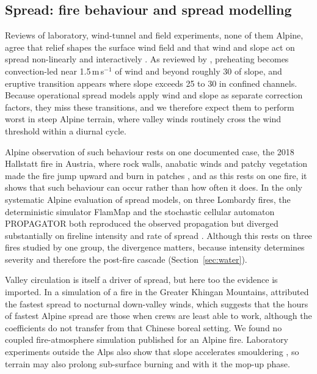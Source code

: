 \documentclass[11pt,a4paper]{article}
\begin{document}
\subsection{Spread: fire behaviour and spread modelling}

Reviews of laboratory, wind-tunnel and field experiments, none of them Alpine, agree that relief shapes the surface wind field and that wind and slope act on spread non-linearly and interactively \citep{hayajneh_wind_2026, sharples_overview_2009, ozaki_impact_2022}. As reviewed by \citet{hayajneh_wind_2026}, preheating becomes convection-led near 1.5\,m\,s$^{-1}$ of wind and beyond roughly 30\degree{} of slope, and eruptive transition appears where slope exceeds 25\degree{} to 30\degree{} in confined channels. Because operational spread models apply wind and slope as separate correction factors, they miss these transitions, and we therefore expect them to perform worst in steep Alpine terrain, where valley winds routinely cross the wind threshold within a diurnal cycle.

Alpine observation of such behaviour rests on one documented case, the 2018 Hallstatt fire in Austria, where rock walls, anabatic winds and patchy vegetation made the fire jump upward and burn in patches \citep{melzner_brief_2019}, and as this rests on one fire, it shows that such behaviour can occur rather than how often it does. In the only systematic Alpine evaluation of spread models, on three Lombardy fires, the deterministic simulator FlamMap and the stochastic cellular automaton PROPAGATOR both reproduced the observed propagation but diverged substantially on fireline intensity and rate of spread \citep{malanchini_modeling_2025}. Although this rests on three fires studied by one group, the divergence matters, because intensity determines severity and therefore the post-fire cascade (Section~\ref{sec:water}).

Valley circulation is itself a driver of spread, but here too the evidence is imported. In a simulation of a fire in the Greater Khingan Mountains, \citet{wang_dynamic_2026} attributed the fastest spread to nocturnal down-valley winds, which suggests that the hours of fastest Alpine spread are those when crews are least able to work, although the coefficients do not transfer from that Chinese boreal setting. We found no coupled fire-atmosphere simulation published for an Alpine fire. Laboratory experiments outside the Alps also show that slope accelerates smouldering \citep{shan_influence_2024}, so terrain may also prolong sub-surface burning and with it the mop-up phase.
\end{document}
